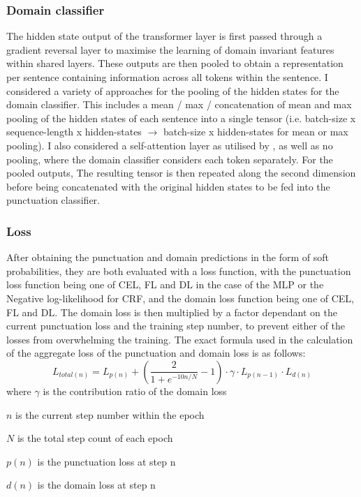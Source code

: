\documentclass[a4paper]{article}
\begin{document}
\begin{multicols}{2}
\subsubsection{Domain classifier}
The hidden state output of the transformer layer is first passed through a gradient reversal layer to maximise the learning of domain invariant features within shared layers. These outputs are then pooled to obtain a representation per sentence containing information across all tokens within the sentence.
I considered a variety of approaches for the pooling of the hidden states for the domain classifier. This includes a mean / max / concatenation of mean and max pooling of the hidden states of each sentence into a single tensor (i.e. batch-size x sequence-length x hidden-states $\rightarrow$ batch-size x hidden-states for mean or max pooling). I also considered a self-attention layer as utilised by \cite{DATnet}, as well as no pooling, where the domain classifier considers each token separately. For the pooled outputs, The resulting tensor is then repeated along the second dimension before being concatenated with the original hidden states to be fed into the punctuation classifier.

\subsubsection{Loss}
After obtaining the punctuation and domain predictions in the form of soft probabilities, they are both evaluated with a loss function, with the punctuation loss function being one of CEL, FL and DL in the case of the MLP or the Negative log-likelihood for CRF, and the domain loss function being one of CEL, FL and DL. The domain loss is then multiplied by a factor dependant on the current punctuation loss and the training step number, to prevent either of the losses from overwhelming the training. The exact formula used in the calculation of the aggregate loss of the punctuation and domain loss is as follows: \[L_{total(n)}=L_{p(n)}+
\left(\frac{2}{1+e^{-10 n/N}}-1\right)\cdot\gamma\cdot L_{p(n-1)} \cdot L_{d(n)}
\]
where $\gamma$ is the contribution ratio of the domain loss

$n$ is the current step number within the epoch

$N$ is the total step count of each epoch

$p(n)$ is the punctuation loss at step n

$d(n)$ is the domain loss at step n


\end{multicols}
\end{document}
